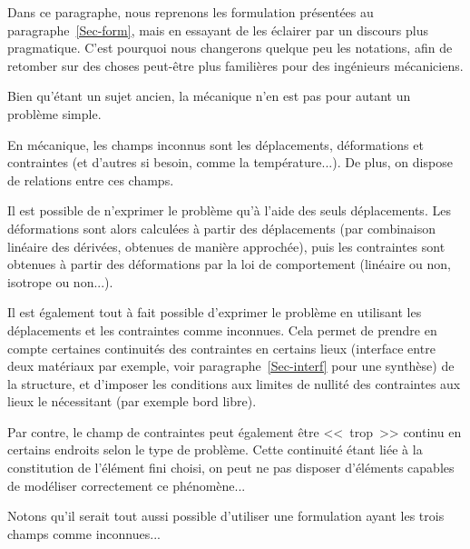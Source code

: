 Dans ce paragraphe, nous reprenons les formulation présentées au paragraphe~\ref{Sec-form},
mais en essayant de les éclairer par un discours plus pragmatique. C'est pourquoi nous
changerons quelque peu les notations, afin de retomber sur des choses peut-être plus familières
pour des ingénieurs mécaniciens.

\medskip
Bien qu'étant un sujet ancien, la mécanique n'en est pas pour autant un problème simple.

En mécanique, les champs inconnus sont les déplacements, déformations
et contraintes (et d'autres si besoin, comme la température...).
De plus, on dispose de relations entre ces champs.

\medskip
Il est possible de n'exprimer le problème qu'à l'aide des seuls déplacements.
Les déformations sont alors calculées à partir des déplacements (par combinaison
linéaire des dérivées, obtenues de manière approchée), puis les contraintes
sont obtenues à partir des déformations par la loi de comportement (linéaire ou non,
isotrope ou non...).

\medskip
Il est également tout à fait possible d'exprimer le problème en
utilisant les déplacements et les contraintes comme inconnues.
Cela permet de prendre en compte certaines continuités des contraintes en certains lieux
(interface entre deux matériaux par exemple, voir paragraphe~\ref{Sec-interf} pour une synthèse)
de la structure, et d'imposer les conditions aux limites de nullité des contraintes aux lieux le nécessitant (par exemple bord libre).

Par contre, le champ de contraintes peut également être <<~trop~>> continu
en certains endroits selon le type de problème. Cette continuité étant
liée à la constitution de l'élément fini choisi, on peut ne pas disposer
d'éléments capables de modéliser correctement ce phénomène...

\medskip
Notons qu'il serait tout aussi possible d'utiliser une formulation ayant les trois champs
comme inconnues...



